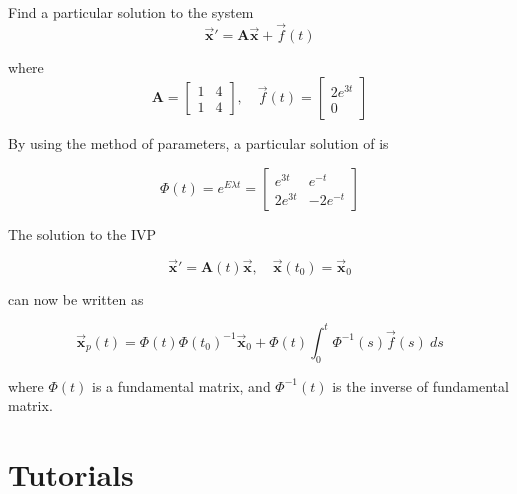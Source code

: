 \begin{example}
    Find a particular solution to the system
    \begin{equation*}
        \overrightarrow{\mathbf{x}}' = \mathbf{A}\overrightarrow{\mathbf{x}} + \overrightarrow{f}(t) 
    \end{equation*}
    
    where 
    \[
        \mathbf{A} = \begin{bmatrix}
            1 & 4\\ 1 & 4
        \end{bmatrix}, \quad 
        \overrightarrow{f}(t) = \begin{bmatrix}
            2e^{3t} \\ 0
        \end{bmatrix}
    \]
\end{example}
\begin{solution}
    By using the method of parameters, a particular solution of is 

    \begin{equation}
        \Phi(t) = e^{E\lambda t} = \begin{bmatrix}
            e^{3t} & e^{-t}\\ 2e^{3t} & -2e^{-t}
        \end{bmatrix}
    \end{equation}
\end{solution}

\begin{theorem}
    The solution to the IVP 

    \begin{equation}
        \overrightarrow{\mathbf{x}}' = \mathbf{A}(t) \overrightarrow{\mathbf{x}}, \quad \overrightarrow{\mathbf{x}}(t_0) = \overrightarrow{\mathbf{x}}_0 
    \end{equation}

    can now be written as

    \begin{equation}
        \overrightarrow{\mathbf{x}}_p(t) = \Phi (t) \Phi (t_0)^{-1} \overrightarrow{\mathbf{x}}_0 + \Phi (t) \int^t_0 \Phi^{-1} (s) \overrightarrow{f}(s) \> ds
    \end{equation}

    where $\Phi(t)$ is a fundamental matrix, and $\Phi^{-1}(t)$ is the inverse of fundamental matrix.
\end{theorem}

\section{Tutorials}

